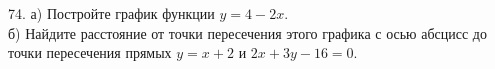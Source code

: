 74. а) Постройте график функции $y=4-2x.$\\
б) Найдите расстояние от точки пересечения этого графика с осью абсцисс до точки пересечения прямых $y=x+2$ и $2x+3y-16=0.$\\

